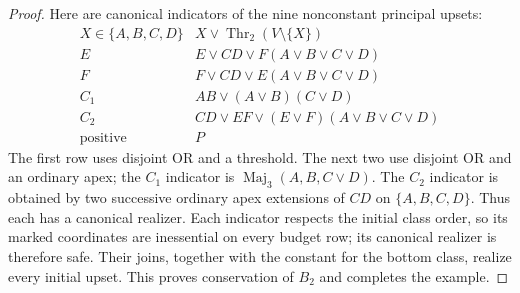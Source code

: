 \begin{proof}
Here are canonical indicators of the nine nonconstant principal upsets:
\[
\begin{array}{c|l}
 X\in\{A,B,C,D\}&X\vee\operatorname{Thr}_2(V\setminus\{X\})\\
 E&E\vee CD\vee F(A\vee B\vee C\vee D)\\
 F&F\vee CD\vee E(A\vee B\vee C\vee D)\\
 C_1&AB\vee(A\vee B)(C\vee D)\\
 C_2&CD\vee EF\vee(E\vee F)(A\vee B\vee C\vee D)\\
 \text{positive}&P
\end{array}
\]
The first row uses disjoint OR and a threshold. The next two use
disjoint OR and an ordinary apex; the $C_1$ indicator is
$\operatorname{Maj}_3(A,B,C\vee D)$. The $C_2$ indicator is obtained
by two successive ordinary apex extensions of $CD$ on $\{A,B,C,D\}$.
Thus each has a canonical realizer. Each indicator respects the initial
class order, so its marked coordinates are inessential on every budget
row; its canonical realizer is therefore safe. Their joins, together
with the constant for the bottom class, realize every initial upset.
This proves conservation of $B_2$ and completes the example.
\end{proof}

